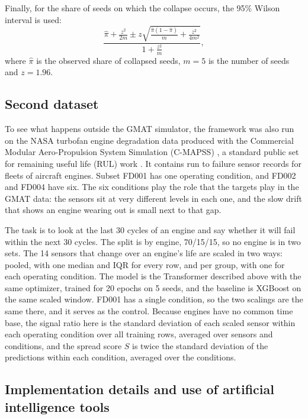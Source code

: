 Finally, for the share of seeds on which the collapse occurs, the 95\% Wilson interval is used:
\begin{equation}
\frac{ \hat{\pi} + \frac{z^2}{2m} \pm z \sqrt{ \frac{ \hat{\pi} (1 - \hat{\pi}) }{m} + \frac{z^2}{4 m^2} } }{ 1 + \frac{z^2}{m} },
\label{eq:wilson}
\end{equation}
where $\hat{\pi}$ is the observed share of collapsed seeds, $m = 5$ is the number of seeds and $z = 1.96$.

\subsection{Second dataset}
\label{sec:second-setup}

To see what happens outside the GMAT simulator, the framework was also run on the NASA turbofan engine degradation data produced with the Commercial Modular Aero-Propulsion System Simulation (C-MAPSS) \cite{saxena2008}, a standard public set for remaining useful life (RUL) work \cite{li2018rul}. It contains run to failure sensor records for fleets of aircraft engines. Subset FD001 has one operating condition, and FD002 and FD004 have six. The six conditions play the role that the targets play in the GMAT data: the sensors sit at very different levels in each one, and the slow drift that shows an engine wearing out is small next to that gap.

The task is to look at the last 30 cycles of an engine and say whether it will fail within the next 30 cycles. The split is by engine, 70/15/15, so no engine is in two sets. The 14 sensors that change over an engine's life are scaled in two ways: pooled, with one median and IQR for every row, and per group, with one for each operating condition. The model is the Transformer described above with the same optimizer, trained for 20 epochs on 5 seeds, and the baseline is XGBoost on the same scaled window. FD001 has a single condition, so the two scalings are the same there, and it serves as the control. Because engines have no common time base, the signal ratio here is the standard deviation of each scaled sensor within each operating condition over all training rows, averaged over sensors and conditions, and the spread score $S$ is twice the standard deviation of the predictions within each condition, averaged over the conditions.

\subsection{Implementation details and use of artificial intelligence tools}
\label{sec:impl}

